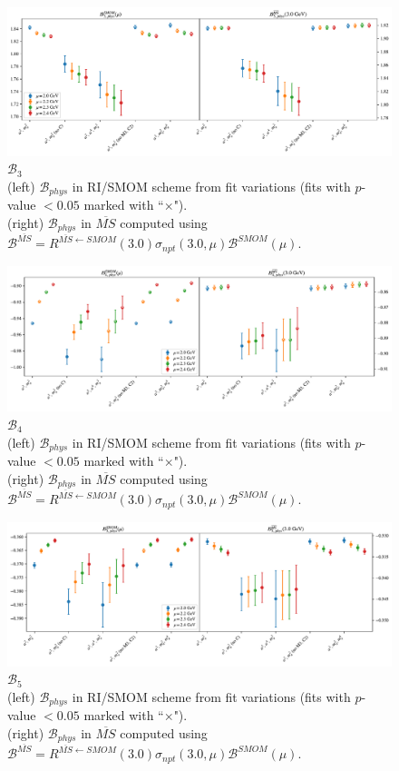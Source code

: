 \documentclass[12pt]{extarticle}
\begin{document}
\begin{figure}
\centering
\includegraphics[page=1, width=1.1\textwidth]{SSmPP/NPR/fit_summary.pdf}
\caption{$\mathcal{B}_{3}$\\(left) $\mathcal{B}_{phys}$ in RI/SMOM scheme from fit variations (fits with $p$-value $<0.05$ marked with ``$\times$"). \\(right) $\mathcal{B}_{phys}$ in $\overline{MS}$ computed using $\mathcal{B}^{\overline{MS}} = R^{\overline{MS}\leftarrow SMOM}(3.0)\sigma_{npt}(3.0,\mu) \mathcal{B}^{SMOM}(\mu)$.}
\end{figure}
\clearpage
\begin{figure}
\centering
\includegraphics[page=1, width=1.1\textwidth]{SSpPP/NPR/fit_summary.pdf}
\caption{$\mathcal{B}_{4}$\\(left) $\mathcal{B}_{phys}$ in RI/SMOM scheme from fit variations (fits with $p$-value $<0.05$ marked with ``$\times$"). \\(right) $\mathcal{B}_{phys}$ in $\overline{MS}$ computed using $\mathcal{B}^{\overline{MS}} = R^{\overline{MS}\leftarrow SMOM}(3.0)\sigma_{npt}(3.0,\mu) \mathcal{B}^{SMOM}(\mu)$.}
\end{figure}
\clearpage
\begin{figure}
\centering
\includegraphics[page=1, width=1.1\textwidth]{TT/NPR/fit_summary.pdf}
\caption{$\mathcal{B}_{5}$\\(left) $\mathcal{B}_{phys}$ in RI/SMOM scheme from fit variations (fits with $p$-value $<0.05$ marked with ``$\times$"). \\(right) $\mathcal{B}_{phys}$ in $\overline{MS}$ computed using $\mathcal{B}^{\overline{MS}} = R^{\overline{MS}\leftarrow SMOM}(3.0)\sigma_{npt}(3.0,\mu) \mathcal{B}^{SMOM}(\mu)$.}
\end{figure}
\clearpage
\end{document}
